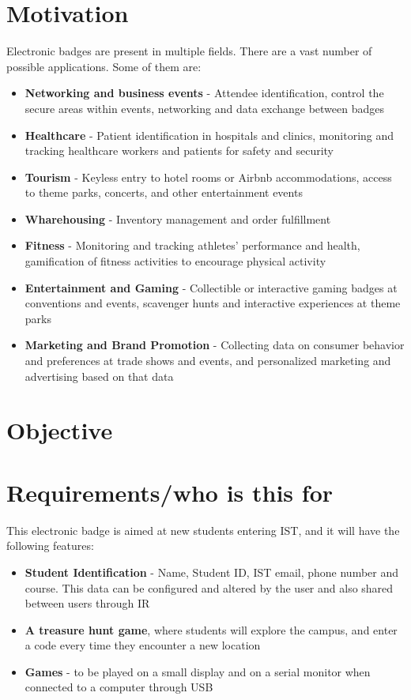 \documentclass[english]{ist-thesis}
\begin{document}
\section{Motivation}

Electronic badges are present in multiple fields. There are a vast number of possible applications. Some of them are:

\begin{itemize}
    \item \textbf{Networking and business events} - Attendee identification, control the secure areas within events, networking and data exchange between badges 
    \item \textbf{Healthcare} - Patient identification in hospitals and clinics, monitoring and tracking healthcare workers and patients for safety and security
    \item \textbf{Tourism} - Keyless entry to hotel rooms or Airbnb accommodations, access to theme parks, concerts, and other entertainment events
    \item \textbf{Wharehousing} - Inventory management and order fulfillment
    \item \textbf{Fitness} - Monitoring and tracking athletes' performance and health, gamification of fitness activities to encourage physical activity
    \item \textbf{Entertainment and Gaming} - Collectible or interactive gaming badges at conventions and events, scavenger hunts and interactive experiences at theme parks
    \item \textbf{Marketing and Brand Promotion} - Collecting data on consumer behavior and preferences at trade shows and events, and personalized marketing and advertising based on that data
\end{itemize}

\section{Objective}

\section{Requirements/who is this for}

This electronic badge is aimed at new students entering IST, and it will have the following features:

\begin{itemize}
    \item \textbf{Student Identification} - Name, Student ID, IST email, phone number and course. This data can be configured and altered by the user and also shared between users through IR
    \item \textbf{A treasure hunt game}, where students will explore the campus, and enter a code every time they encounter a new location
    \item \textbf{Games} - to be played on a small display and on a serial monitor when connected to a computer through USB
\end{itemize}
\end{document}

